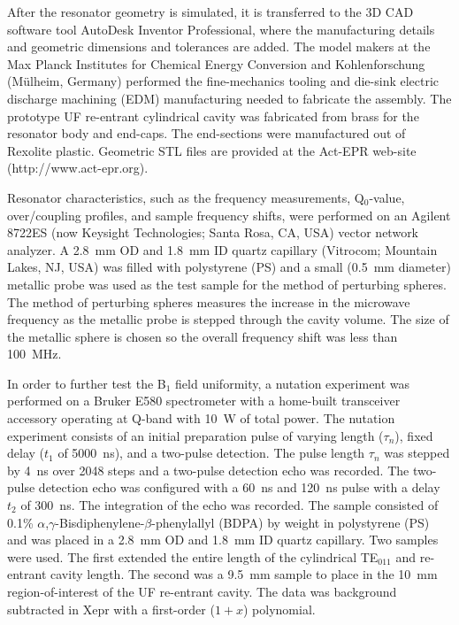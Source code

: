After the resonator geometry is simulated, it is transferred to the 3D CAD software tool AutoDesk Inventor Professional, where the manufacturing details and geometric dimensions and tolerances are added. The model makers at the Max Planck Institutes for Chemical Energy Conversion and Kohlenforschung (M\"ulheim, Germany) performed the fine-mechanics tooling and die-sink electric discharge machining (EDM) manufacturing needed to fabricate the assembly. The prototype UF re-entrant cylindrical \cylTE{} cavity was fabricated from brass for the resonator body and end-caps. The end-sections were manufactured out of Rexolite plastic. Geometric STL files are provided at the Act-EPR web-site (http://www.act-epr.org). 

Resonator characteristics, such as the frequency measurements, Q$_0$-value, over\-/coupling profiles, and sample frequency shifts, were performed on an Agilent 8722ES (now Keysight Technologies; Santa Rosa, CA, USA) vector network analyzer. A 2.8~mm OD and 1.8~mm ID quartz capillary (Vitrocom; Mountain Lakes, NJ, USA) was filled with polystyrene (PS) and a small (0.5~mm diameter) metallic probe was used as the test sample for the method of perturbing spheres. The method of perturbing spheres measures the increase in the microwave frequency as the metallic probe is stepped through the cavity volume. The size of the metallic sphere is chosen so the overall frequency shift was less than 100~MHz.

In order to further test the B$_1$ field uniformity, a nutation experiment was performed on a Bruker E580 spectrometer with a home-built transceiver accessory operating at Q-band with 10~W of total power. The nutation experiment consists of an initial preparation pulse of varying length ($\tau_n$), fixed delay ($t_1$ of 5000~ns), and a two-pulse detection. The pulse length $\tau_n$ was stepped by 4~ns over 2048 steps and a two-pulse detection echo was recorded. \cite{pulsejeschke} The two-pulse detection echo was configured with a 60~ns and 120~ns pulse with a delay $t_2$ of 300~ns. The integration of the echo was recorded. The sample consisted of 0.1\% $\alpha$,$\gamma$-Bisdiphenylene-$\beta$-phenylallyl (BDPA) by weight in polystyrene (PS) and was placed in a 2.8~mm OD and 1.8~mm ID  quartz capillary. Two samples were used. The first extended the entire length of the cylindrical TE$_{011}$ and re-entrant \cylTE{} cavity length. The second was a 9.5~mm sample to place in the 10~mm region-of-interest of the UF re-entrant \cylTE{} cavity. The data was background subtracted in Xepr with a first-order ($1+x$) polynomial.

